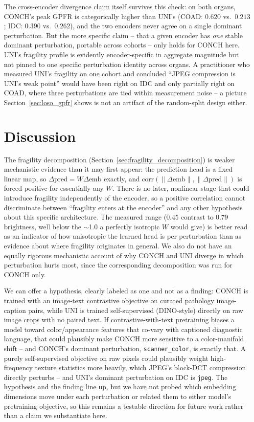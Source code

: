 \documentclass[11pt]{article}
\begin{document}
The cross-encoder divergence claim itself survives this check: on both organs, CONCH's peak GPFR is categorically higher than UNI's (COAD: $0.620$ vs.\ $0.213$; IDC: $0.390$ vs.\ $0.262$), and the two encoders never agree on a single dominant perturbation. But the more specific claim -- that a given encoder has \emph{one} stable dominant perturbation, portable across cohorts -- only holds for CONCH here. UNI's fragility profile is evidently encoder-specific in aggregate magnitude but not pinned to one specific perturbation identity across organs. A practitioner who measured UNI's fragility on one cohort and concluded ``JPEG compression is UNI's weak point'' would have been right on IDC and only partially right on COAD, where three perturbations are tied within measurement noise -- a picture Section~\ref{sec:loso_gpfr} shows is not an artifact of the random-split design either.

\section{Discussion}

The fragility decomposition (Section~\ref{sec:fragility_decomposition}) is weaker mechanistic evidence than it may first appear: the prediction head is a fixed linear map, so $\Delta\text{pred} = W\Delta\text{emb}$ exactly, and $\text{corr}(\lVert\Delta\text{emb}\rVert, \lVert\Delta\text{pred}\rVert)$ is forced positive for essentially any $W$. There is no later, nonlinear stage that could introduce fragility independently of the encoder, so a positive correlation cannot discriminate between ``fragility enters at the encoder'' and any other hypothesis about this specific architecture. The measured range ($0.45$ contrast to $0.79$ brightness, well below the $\sim$1.0 a perfectly isotropic $W$ would give) is better read as an indicator of how anisotropic the learned head is per perturbation than as evidence about where fragility originates in general. We also do not have an equally rigorous mechanistic account of why CONCH and UNI diverge in which perturbation hurts most, since the corresponding decomposition was run for CONCH only.

We can offer a hypothesis, clearly labeled as one and not as a finding: CONCH is trained with an image-text contrastive objective on curated pathology image-caption pairs, while UNI is trained self-supervised (DINO-style) directly on raw image crops with no paired text. If contrastive-with-text pretraining biases a model toward color/appearance features that co-vary with captioned diagnostic language, that could plausibly make CONCH more sensitive to a color-manifold shift -- and CONCH's dominant perturbation, \texttt{scanner\_color}, is exactly that. A purely self-supervised objective on raw pixels could plausibly weight high-frequency texture statistics more heavily, which JPEG's block-DCT compression directly perturbs -- and UNI's dominant perturbation on IDC is \texttt{jpeg}. The hypothesis and the finding line up, but we have not probed which embedding dimensions move under each perturbation or related them to either model's pretraining objective, so this remains a testable direction for future work rather than a claim we substantiate here.
\end{document}
